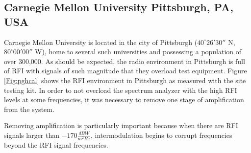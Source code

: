 \subsection{Carnegie Mellon University Pittsburgh, PA, USA}

Carnegie Mellon University is located in the city of Pittsburgh ($40^\circ 26'30''$ N, $80^\circ 00' 00''$ W), home to several such universities and possessing a population of over 300,000. As should be expected, the radio environment in Pittsburgh is full of RFI with signals of such magnitude that they overload test equipment. Figure \ref{Fig:pghcal} shows the RFI environment in Pittsburgh as measured with the site testing kit. In order to not overload the spectrum analyzer with the high RFI levels at some frequencies, it was necessary to remove one stage of amplification from the system. 

Removing amplification is particularly important because when there are RFI signals larger than $-170 \frac{dBW}{m^2 Hz}$, intermodulation begins to corrupt frequencies beyond the RFI signal frequencies. 


